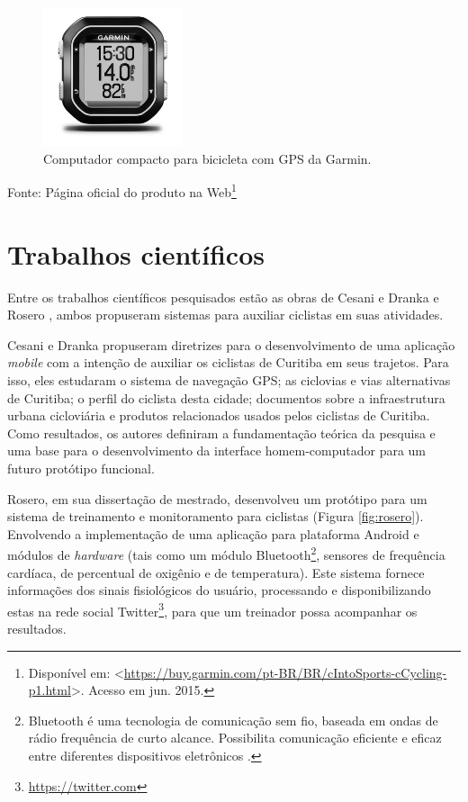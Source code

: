 \begin{figure}[h]
    \caption{Computador compacto para bicicleta com GPS da Garmin.}
    \centerline{\includegraphics[width=11em]{figuras/cf-lg.jpg}}
    \label{fig:garmin}
\end{figure}
\centerline{Fonte: Página oficial do produto na Web\footnote{Disponível em:  <\url{https://buy.garmin.com/pt-BR/BR/cIntoSports-cCycling-p1.html}>. Acesso  em jun. 2015.}}

\section{Trabalhos científicos}
Entre os trabalhos científicos pesquisados estão as obras de Cesani e Dranka \citeyearpar{cesani2013} e Rosero \citeyearpar{gaidos2012}, ambos propuseram sistemas para auxiliar ciclistas em suas atividades. \par

Cesani e Dranka propuseram diretrizes para o desenvolvimento de uma aplicação \textit{mobile} com a intenção de auxiliar os ciclistas de Curitiba em seus trajetos. Para isso, eles estudaram o sistema de navegação GPS; as ciclovias e vias alternativas de Curitiba; o perfil do ciclista desta cidade; documentos sobre a infraestrutura urbana cicloviária e produtos relacionados usados pelos ciclistas de Curitiba. Como resultados, os autores definiram a fundamentação teórica da pesquisa e uma base para o desenvolvimento da interface homem-computador para um futuro protótipo funcional. \par

Rosero, em sua dissertação de mestrado, desenvolveu um protótipo para um sistema de treinamento e monitoramento para ciclistas (Figura \ref{fig:rosero}). Envolvendo a implementação de uma aplicação para plataforma Android e módulos de \textit{hardware} (tais como um módulo Bluetooth\footnote{Bluetooth é uma tecnologia de comunicação sem fio, baseada em ondas de rádio frequência de curto alcance. Possibilita comunicação eficiente e eficaz entre diferentes dispositivos eletrônicos \cite{gaidos2012}.}, sensores de frequência cardíaca, de percentual de oxigênio e de temperatura). Este sistema fornece informações dos sinais fisiológicos do usuário, processando e disponibilizando estas na rede social Twitter\footnote{\url{https://twitter.com}}, para que um treinador possa acompanhar os resultados.

